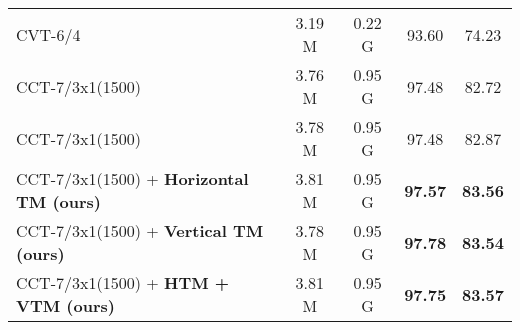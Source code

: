 \documentclass{article}
\begin{document}
\begin{table}[t]
\begin{adjustbox}{width=0.9\textwidth}
\begin{tabular}{l@{\hskip 0.2in} |@{\hskip 0.1in} c c@{\hskip 0.1in} |@{\hskip 0.1in} c@{\hskip 0.1in} c@{\hskip 0.1in}}
        CVT-6/4~\cite{hassani2021escaping} & 3.19 M & 0.22 G & 93.60 & 74.23  \\
        CCT-7/3x1(1500)~\cite{hassani2021escaping}  & 3.76 M & 0.95 G & 97.48 & 82.72 \\
        CCT-7/3x1(1500)   & 3.78 M & 0.95 G & 97.48 & 82.87  \\
        CCT-7/3x1(1500) + \textbf{Horizontal TM (ours)} & 3.81 M  & 0.95 G & \textbf{97.57}  & \textbf{83.56}  \\
        CCT-7/3x1(1500) + \textbf{Vertical TM (ours)} & 3.78 M & 0.95 G & \cellcolor{yellow!25}\textbf{97.78} & \textbf{83.54} \\ 
        CCT-7/3x1(1500) + \textbf{HTM + VTM (ours)} & 3.81 M & 0.95 G & \textbf{97.75} & \cellcolor{yellow!25}\textbf{83.57} \\ 
        \bottomrule
    \end{tabular}
    \end{adjustbox}
    \label{tab:cifar}
\end{table}
\vspace{-4mm}
\end{document}
